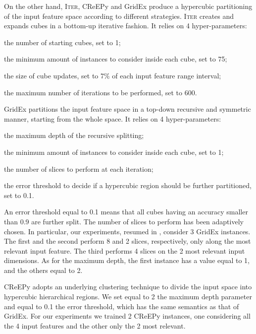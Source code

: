 \documentclass{article}
\newcommand{\iter}{\textsc{Iter}}
\newcommand{\gridex}{GridEx}
\newcommand{\creepy}{CReEPy}
\newenvironment{inlinelist}{\begin{enumerate*}[label=\emph{(\roman{*})}]}{\end{enumerate*}}
\begin{document}
On the other hand, \iter{}, \creepy{} and \gridex{} produce a hypercubic partitioning of the input feature space according to different strategies.
%
\iter{} creates and expands cubes in a bottom-up iterative fashion.
%
It relies on 4 hyper-parameters:
%
\begin{inlinelist}
	\item the number of starting cubes, set to 1;
	\item the minimum amount of instances to consider inside each cube, set to 75;
	\item the size of cube updates, set to 7\% of each input feature range interval;
	\item the maximum number of iterations to be performed, set to 600.
\end{inlinelist}

\gridex{} partitions the input feature space in a top-down recursive and symmetric manner, starting from the whole space.
%
It relies on 4 hyper-parameters:
%
\begin{inlinelist}
	\item the maximum depth of the recursive splitting;
	\item the minimum amount of instances to consider inside each cube, set to 1;
	\item the number of slices to perform at each iteration;
	\item the error threshold to decide if a hypercubic region should be further partitioned, set to 0.1.
\end{inlinelist}
%
An error threshold equal to 0.1 means that all cubes having an accuracy smaller than 0.9 are further split.
%
The number of slices to perform has been adaptively chosen.
%
In particular, our experiments, resumed in , consider 3 \gridex{} instances.
%
The first and the second perform 8 and 2 slices, respectively, only along the most relevant input feature.
%
The third performs 4 slices on the 2 most relevant input dimensions.
%
As for the maximum depth, the first instance has a value equal to 1, and the others equal to 2.

\creepy{} adopts an underlying clustering technique to divide the input space into hypercubic hierarchical regions.
%
We set equal to 2 the maximum depth parameter and equal to 0.1 the error threshold, which has the same semantics as that of \gridex{}.
%
For our experiments we trained 2 \creepy{} instances, one considering all the 4 input features and the other only the 2 most relevant.
\end{document}
